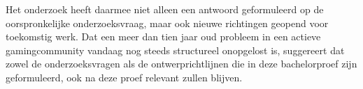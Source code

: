 \bigskip

Het onderzoek heeft daarmee niet alleen een antwoord geformuleerd op de oorspronkelijke onderzoeksvraag, maar ook nieuwe richtingen geopend voor toekomstig werk. Dat een meer dan tien jaar oud probleem in een actieve gamingcommunity vandaag nog steeds structureel onopgelost is, suggereert dat zowel de onderzoeksvragen als de ontwerprichtlijnen die in deze bachelorproef zijn geformuleerd, ook na deze proef relevant zullen blijven.
